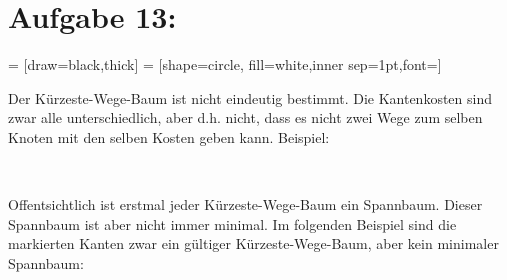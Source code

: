 \documentclass[11pt]{scrartcl} %
\begin{document}
\section*{Aufgabe 13:}
 = [draw=black,thick]
 = [shape=circle, fill=white,inner sep=1pt,font=\small]
\begin{compactenum}[(a)]
\item Der Kürzeste-Wege-Baum ist nicht eindeutig bestimmt. Die Kantenkosten sind zwar alle unterschiedlich, aber d.h. nicht, dass es nicht zwei Wege zum selben Knoten mit den selben Kosten geben kann. Beispiel:\\
    \begin{center}
    \\[0.5cm]
    \end{center}

\item Offentsichtlich ist erstmal jeder Kürzeste-Wege-Baum ein Spannbaum. Dieser Spannbaum ist aber nicht immer minimal. Im folgenden Beispiel sind die markierten Kanten zwar ein gültiger Kürzeste-Wege-Baum, aber kein minimaler Spannbaum:\\
    \begin{center}
    \\[0.5cm]
    \end{center}
\end{compactenum}
\end{document}
